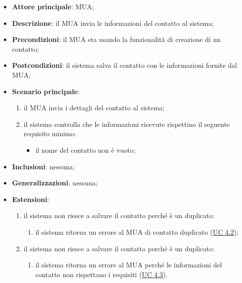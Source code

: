     \begin{itemize}
        \item \textbf{Attore principale}: MUA;
        \item \textbf{Descrizione}: il MUA invia le informazioni del contatto al sistema;
        \item \textbf{Precondizioni}: il MUA sta usando la funzionalità di creazione di un contatto;
        \item \textbf{Postcondizioni}: il sistema salva il contatto con le informazioni fornite dal MUA;
        \item \textbf{Scenario principale}:
            \begin{enumerate}
                \item il MUA invia i dettagli del contatto al sistema;
                \item il sistema controlla che le informazioni ricevute rispettino il seguente requisito minimo:
                    \begin{itemize}
                        \item il nome del contatto non è vuoto;
                    \end{itemize}
            \end{enumerate}
        \item \textbf{Inclusioni}: nessuna;
        \item \textbf{Generalizzazioni}: nessuna;
        \item \textbf{Estensioni}:
            \begin{enumerate}[label=\alph*.]
                \item il sistema non riesce a salvare il contatto perché è un duplicato:
                \begin{enumerate}[label=\arabic*.]
                    \item il sistema ritorna un errore al MUA di contatto duplicato (\hyperref[sec:UC4.2]{UC 4.2});
                \end{enumerate}
                \item il sistema non riesce a salvare il contatto perché è un duplicato:
                \begin{enumerate}[label=\arabic*.]
                    \item il sistema ritorna un errore al MUA perché le informazioni del contatto non rispettano i requisiti (\hyperref[sec:UC4.3]{UC 4.3}).
                \end{enumerate}
            \end{enumerate}
    \end{itemize}


